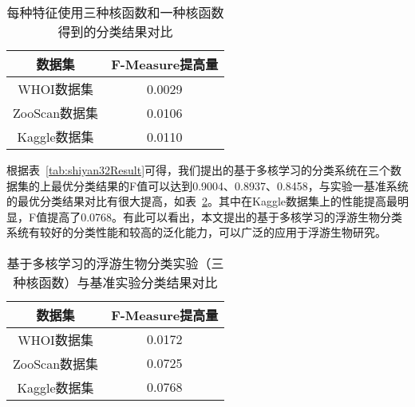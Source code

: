 
\begin{table}[htbp]
\small
  \centering
  \caption{每种特征使用三种核函数和一种核函数得到的分类结果对比}
  \label{tab:compare3}
  \begin{tabular}[c]{cc}
    \toprule
    数据集 & F-Measure提高量\\
    \midrule
    WHOI数据集 & 0.0029\\
    ZooScan数据集 & 0.0106\\
    Kaggle数据集 & 0.0110\\
    \bottomrule
  \end{tabular}
\end{table}

根据表~\ref{tab:shiyan32Result}可得，我们提出的基于多核学习的分类系统在三个数据集的上最优分类结果的F值可以达到0.9004、0.8937、0.8458，与实验一基准系统的最优分类结果对比有很大提高，如表~\ref{tab:compare3and1}。其中在Kaggle数据集上的性能提高最明显，F值提高了0.0768。有此可以看出，本文提出的基于多核学习的浮游生物分类系统有较好的分类性能和较高的泛化能力，可以广泛的应用于浮游生物研究。

\begin{table}[ht]
\small
  \centering
  \caption{基于多核学习的浮游生物分类实验（三种核函数）与基准实验分类结果对比}
  \label{tab:compare3and1}
  \begin{tabular}[c]{cc}
    \toprule
    数据集 & F-Measure提高量\\
    \midrule
    WHOI数据集 & 0.0172\\
    ZooScan数据集 & 0.0725\\
    Kaggle数据集 & 0.0768\\
    \bottomrule
  \end{tabular}
\end{table}

